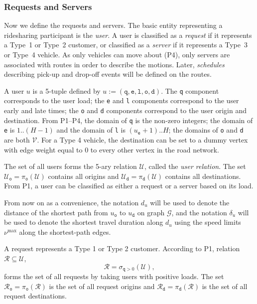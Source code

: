 \documentclass{article}
\newcommand{\hi}[1]{\noindent {\bf #1}}
\theoremstyle{definition}
\begin{document}
\subsubsection{Requests and Servers}
\label{sec:requests-and-servers}
Now we define the requests and servers.
The basic entity representing a ridesharing participant is the \emph{user}.  A
user is classified as a \emph{request} if it represents a Type~1 or Type~2
customer, or classified as a \emph{server} if it represents a Type~3 or Type~4
vehicle. As only vehicles can move about (P4), only servers are associated with
routes in order to describe the motions. Later, \emph{schedules} describing
pick-up and drop-off events will be defined on the routes.

\hi{User Relation}
A user $u$ is a 5-tuple defined by
${u:=(\texttt{q},\texttt{e},\texttt{l},\texttt{o},\texttt{d})}$.  The
\texttt{q} component corresponds to the user load; the \texttt{e} and
\texttt{l} components correspond to the user early and late times; the
\texttt{o} and \texttt{d} components correspond to the user origin and
destination.
From P1--P4, the domain of \texttt{q} is the non-zero integers; the domain of \texttt{e} is
$1..(H-1)$ and the domain of \texttt{l} is $(u_\texttt{e}+1)..H$; the domains
of \texttt{o} and \texttt{d} are both $\mathcal{V}$.
For a Type 4 vehicle, the destination can be set to a dummy vertex with edge
weight equal to 0 to every other vertex in the road network.

The set of all users forms the 5-ary relation $\mathcal{U}$, called
the \emph{user relation}.
The set
$\mathcal{U}_\texttt{o}=\pi_\texttt{o}(\mathcal{U})$ contains all origins and
$\mathcal{U}_\texttt{d}=\pi_\texttt{d}(\mathcal{U})$ contains all destinations.
From P1, a user can be classified as either a request or a server based on its load.

From now on as a convenience, the notation $d_u$ will be used to denote the distance of the
shortest path from $u_\texttt{o}$ to $u_\texttt{d}$ on graph $\mathcal{G}$, and
the notation $\delta_u$ will be used to denote the shortest travel duration
along $d_u$ using the speed limits $\nu^\textrm{max}$ along the shortest-path edges.

\hi{Requests.}
A request represents a Type 1 or Type 2 customer.
According to P1,
relation $\mathcal{R}\subseteq\mathcal{U}$,
$$\mathcal{R}=\sigma_{\texttt{q}>0}(\mathcal{U}),$$
forms the set of all requests by taking users with positive loads. The set
$\mathcal{R}_\texttt{o}=\pi_\texttt{o}(\mathcal{R})$ is the set of all request origins and
$\mathcal{R}_\texttt{d}=\pi_\texttt{d}(\mathcal{R})$ is the set of all request destinations.
\end{document}
